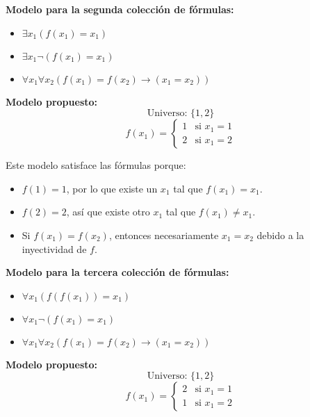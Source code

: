 \begin{solution}
\begin{itemize}
\end{itemize}

\textbf{Modelo para la segunda colección de fórmulas:}

\begin{itemize}
    \item $\exists x_1 (f(x_1) = x_1)$
    
    \item $\exists x_1 \neg (f(x_1) = x_1)$
    
    \item $\forall x_1 \forall x_2 (f(x_1) = f(x_2) \to (x_1 = x_2))$
\end{itemize}

\textbf{Modelo propuesto:}
\[
\text{Universo: } \{1, 2\}
\]
\[
f(x_1) = \left\{
    \begin{array}{ll}
        1 & \text{si } x_1 = 1 \\
        2 & \text{si } x_1 = 2
    \end{array}
\right.
\]

Este modelo satisface las fórmulas porque:

\begin{itemize}
    \item \( f(1) = 1 \), por lo que existe un \( x_1 \) tal que \( f(x_1) = x_1 \).
    \item \( f(2) = 2 \), así que existe otro \( x_1 \) tal que \( f(x_1) \neq x_1 \).
    \item Si \( f(x_1) = f(x_2) \), entonces necesariamente \( x_1 = x_2 \) debido a la inyectividad de \( f \).
\end{itemize}


\textbf{Modelo para la tercera colección de fórmulas:}

\begin{itemize}
    \item $\forall x_1 (f(f(x_1)) = x_1)$
    
    \item $\forall x_1 \neg (f(x_1) = x_1)$
    
    \item $\forall x_1 \forall x_2 (f(x_1) = f(x_2) \to (x_1 = x_2))$
\end{itemize}

\textbf{Modelo propuesto:}
\[
\text{Universo: } \{1, 2\}
\]
\[
f(x_1) = \left\{
    \begin{array}{ll}
        2 & \text{si } x_1 = 1 \\
        1 & \text{si } x_1 = 2
    \end{array}
\right.
\]


\end{solution}
